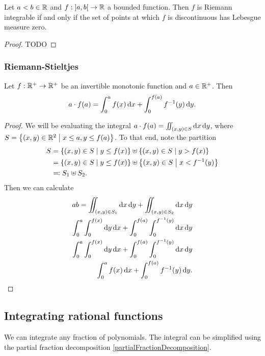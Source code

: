 \begin{proposition}
Let $a<b\in \mathbb{R}$ and $f: \interval[o]{a,b}\to \R$ a bounded function. Then $f$ is Riemann integrable \textup{if and only if} the set of points at which $f$ is discontinuous has Lebesgue measure zero.
\end{proposition}
\begin{proof}
TODO
\end{proof}

\subsubsection{Riemann-Stieltjes}

\begin{lemma} \label{rectanglePartitionedByMonotonicFunction}
Let $f: \mathbb{R}^+ \to \mathbb{R}^+$ be an invertible monotonic function and $a\in\mathbb{R}^+$. Then
\[ a\cdot f(a) = \int_0^a f(x)\operatorname{d \!}{x} + \int_0^{f(a)} f^{-1}(y)\operatorname{d \!}{y}. \]
\end{lemma}
\begin{proof}
We will be evaluating the integral $a\cdot f(a) = \iint_{(x,y)\in S}\operatorname{d \!}{x}\operatorname{d \!}{y}$, where $S = \setbuilder{(x,y)\in \R^2}{x\leq a, y\leq f(a)}$. To that end, note the partition
\begin{align*}
S &= \setbuilder{(x,y)\in S}{y\leq f(x)} \uplus \setbuilder{(x,y)\in S}{y > f(x)} \\
&= \setbuilder{(x,y)\in S}{y\leq f(x)} \uplus \setbuilder{(x,y)\in S}{x < f^{-1}(y)} \\
&\eqdef S_1 \uplus S_2.
\end{align*}
Then we can calculate
\begin{align*}
ab = \iint_{(x,y)\in S_1}\diff{x}\diff{y} + \iint_{(x,y)\in S_2}\diff{x}\diff{y} \\
\int_0^a\int_0^{f(x)}\diff{y}\diff{x} + \int_0^{f(a)}\int_0^{f^{-1}(y)}\diff{x}\diff{y} \\
\int_0^a\int_0^{f(x)}\diff{y}\diff{x} + \int_0^{f(a)}\int_0^{f^{-1}(y)}\diff{x}\diff{y} \\
\int_0^a f(x)\diff{x} + \int_0^{f(a)} f^{-1}(y)\diff{y}.
\end{align*}
\end{proof}

\subsection{Integrating rational functions}
We can integrate any fraction of polynomials. The integral can be simplified using the partial fraction decomposition \ref{partialFractionDecomposition}.

